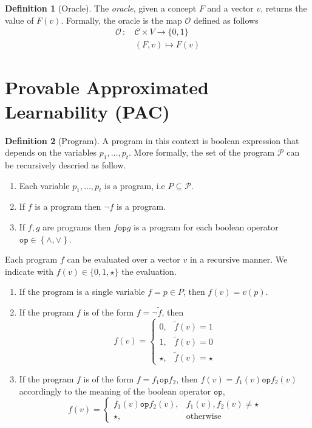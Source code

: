 \documentclass[a4paper,11pt]{article}
\theoremstyle{definition}
\newtheorem{defn}{Definition}
\begin{document}
\begin{defn}[Oracle]
  The \textit{oracle}, given a concept $F$ and a vector $v$, returns the value
  of $F(v)$. Formally, the oracle is the map $\mathcal{O}$ defined as follows
  \begin{equation}
    \begin{aligned}
      \mathcal{O}\,:\, &\mathcal{C}\times V \to \{0,1\}\\
      & \left( F,v \right) \mapsto F(v)
    \end{aligned}
    \label{oracle}
  \end{equation}
\end{defn}
\section{Provable Approximated Learnability (PAC)}
\begin{defn}[Program] 
  A program in this context is boolean expression that depends on the
  variables $p_1,\dots,p_t$. More formally, the set of the program
  $\mathcal{P}$ can be recursively descried as follow.
  \begin{enumerate}
    \item Each variable $p_1,\dots,p_t$ is a program, i.e $P\subseteq \mathcal{P}$.
    \item If $f$ is a program then $\lnot f$ is a program.
    \item If $f,g$ are programs then $f \texttt{op} g$ is a program for each
      boolean operator $\texttt{op}\in\left\{\land, \lor \right\}$.
  \end{enumerate}

  Each program $f$ can be evaluated over a vector $v$ in a recursive manner.
  We indicate with $f(v)\in\{0,1,\star\}$ the evaluation.
  \begin{enumerate}
    \item If the program is a single variable $f = p \in P$, then $f(v) =
      v(p)$.
    \item If the program $f$ is of the form $f = \lnot\tilde f$, then
      \[
        f(v)=
        \begin{cases}
          0,&\tilde f(v)=1\\
          1,&\tilde f(v)=0\\
          \star,&\tilde f(v)=\star
        \end{cases}
      \]
    \item If the program $f$ is of the form $f = f_1 \texttt{op} f_2$, then
      $f(v)= f_1(v)\texttt{op} f_2(v)$ accordingly to the meaning of the
      boolean operator $\texttt{op}$,  
      \[
        f(v) =
        \begin{cases}
          f_1(v)\texttt{op}f_2(v),& f_1(v),f_2(v)\ne\star\\
          \star,&\mbox{otherwise}
        \end{cases}
      \]
  \end{enumerate}
\end{defn}
\end{document}
